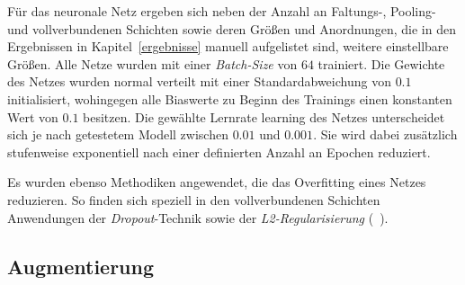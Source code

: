 Für das neuronale Netz ergeben sich neben der Anzahl an Faltungs-, Pooling- und vollverbundenen Schichten sowie deren Größen und Anordnungen, die in den Ergebnissen in Kapitel~\ref{ergebnisse} manuell aufgelistet sind, weitere einstellbare Größen.
Alle Netze wurden mit einer \emph{Batch-Size} von $64$ trainiert.
Die Gewichte des Netzes wurden normal verteilt mit einer Standardabweichung von $0.1$ initialisiert, wohingegen alle Biaswerte zu Beginn des Trainings einen konstanten Wert von  $0.1$ besitzen.
Die gewählte Lernrate \gls{learning} des Netzes unterscheidet sich je nach getestetem Modell zwischen $0.01$ und $0.001$.
Sie wird dabei zusätzlich stufenweise exponentiell nach einer definierten Anzahl an Epochen reduziert.

Es wurden ebenso Methodiken angewendet, die das Overfitting eines Netzes reduzieren.
So finden sich speziell in den vollverbundenen Schichten Anwendungen der \emph{Dropout}-Technik sowie der \emph{L2-Regularisierung} (\vgl{}~\cite{dropout, weight_decay}).

\subsection{Augmentierung}
\label{augmentierung}

